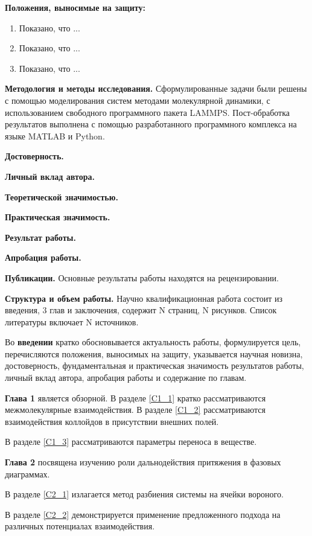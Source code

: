 \textbf{Положения, выносимые на защиту:}
\begin{enumerate}
\item Показано, что ...

\item Показано, что ...

\item Показано, что ...

\end{enumerate}

\textbf{Методология и методы исследования.} 
Сформулированные задачи были решены с помощью моделирования систем методами молекулярной динамики, с использованием свободного программного пакета LAMMPS. Пост-обработка результатов выполнена с помощью разработанного программного комплекса на языке MATLAB и Python.


\textbf{Достоверность.} 

\textbf{Личный вклад автора.}

\textbf{Теоретической значимостью.} 

\textbf{Практическая значимость.} 

\textbf{Результат работы.} 

\textbf{Апробация работы.} 

\textbf{Публикации.} 
Основные результаты работы находятся на рецензировании.

\textbf{Структура и объем работы.} 
Научно квалификационная работа состоит из введения, 3 глав и заключения, содержит N страниц, N рисунков.
Список литературы включает N источников.

Во \textbf{введении} кратко обосновывается актуальность работы, формулируется цель, перечисляются положения, выносимых на защиту, указывается научная новизна, достоверность, фундаментальная и практическая значимость результатов работы, личный вклад автора, апробация работы и содержание по главам.


\textbf{Глава 1} является обзорной.
В разделе \ref{C1_1} кратко рассматриваются межмолекулярные взаимодействия.
В разделе \ref{C1_2} рассматриваются взаимодействия коллойдов в присутствии внешних полей.

В разделе \ref{C1_3} рассматриваются параметры переноса в веществе. 


\textbf{Глава 2} посвящена изучению роли дальнодействия притяжения в фазовых диаграммах.


В разделе \ref{C2_1} излагается метод разбиения системы на ячейки вороного.

В разделе \ref{C2_2} демонстрируется применение предложенного подхода на различных потенциалах взаимодействия.

